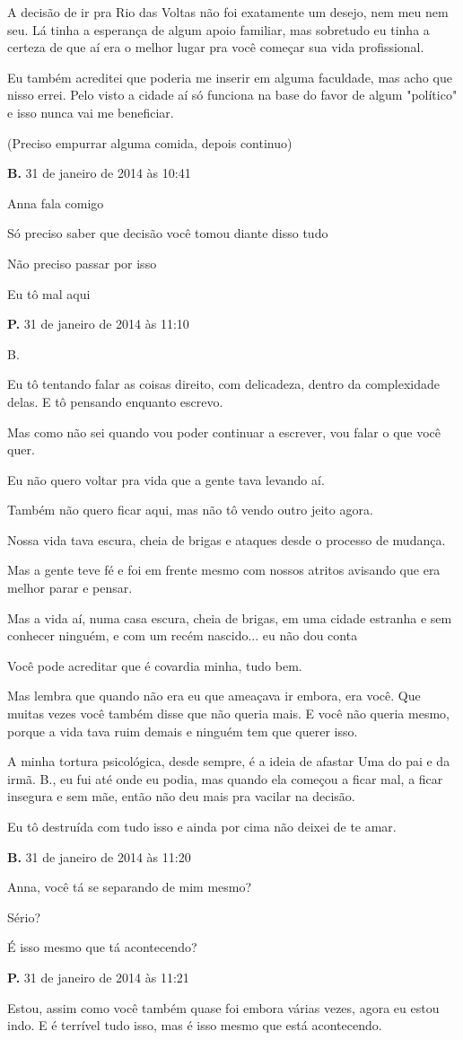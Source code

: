 {A decisão de ir pra Rio das Voltas não foi exatamente um desejo, nem meu
nem seu. Lá tinha a esperança de algum apoio familiar, mas sobretudo eu
tinha a certeza de que aí era o melhor lugar pra você começar sua vida
profissional.

Eu também acreditei que poderia me inserir em alguma faculdade, mas acho
que nisso errei. Pelo visto a cidade aí só funciona na base do favor de
algum "político" e isso nunca vai me beneficiar.

(Preciso empurrar alguma comida, depois continuo)

\textbf{B.} 31 de janeiro de 2014 às 10:41

Anna fala comigo

Só preciso saber que decisão você tomou diante disso tudo

Não preciso passar por isso

Eu tô mal aqui

\textbf{P.} 31 de janeiro de 2014 às 11:10

B.

Eu tô tentando falar as coisas direito, com delicadeza, dentro da
complexidade delas. E tô pensando enquanto escrevo.

Mas como não sei quando vou poder continuar a escrever, vou falar o que
você quer.

Eu não quero voltar pra vida que a gente tava levando aí.

Também não quero ficar aqui, mas não tô vendo outro jeito agora.

Nossa vida tava escura, cheia de brigas e ataques desde o processo de
mudança.

Mas a gente teve fé e foi em frente mesmo com nossos atritos avisando
que era melhor parar e pensar.

Mas a vida aí, numa casa escura, cheia de brigas, em uma cidade estranha
e sem conhecer ninguém, e com um recém nascido... eu não dou conta

Você pode acreditar que é covardia minha, tudo bem.

Mas lembra que quando não era eu que ameaçava ir embora, era você. Que
muitas vezes você também disse que não queria mais. E você não queria
mesmo, porque a vida tava ruim demais e ninguém tem que querer isso.

A minha tortura psicológica, desde sempre, é a ideia de afastar Uma do
pai e da irmã. B., eu fui até onde eu podia, mas quando ela começou a
ficar mal, a ficar insegura e sem mãe, então não deu mais pra vacilar na
decisão.

Eu tô destruída com tudo isso e ainda por cima não deixei de te amar.

\textbf{B.} 31 de janeiro de 2014 às 11:20

Anna, você tá se separando de mim mesmo?

Sério?

É isso mesmo que tá acontecendo?

\textbf{P.} 31 de janeiro de 2014 às 11:21

Estou, assim como você também quase foi embora várias vezes, agora eu
estou indo. E é terrível tudo isso, mas é isso mesmo que está
acontecendo.
}

